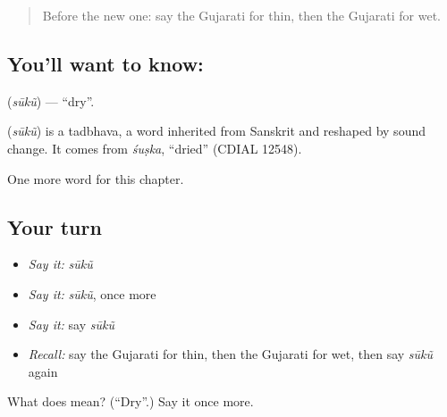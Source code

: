 \label{lesson:GU-C131-suku}



\begin{quote}
Before the new one: say the Gujarati for thin, then the Gujarati for wet.
\end{quote}

\subsection*{You'll want to know: }
\textbf{} (\emph{sūkũ}) — \textquotedblleft{}dry\textquotedblright{}.

\begin{cousinweb}
\textbf{} (\emph{sūkũ}) is a tadbhava, a word inherited from Sanskrit and reshaped by sound change. It comes from \emph{śuṣka}, \textquotedblleft{}dried\textquotedblright{} (CDIAL 12548).
\end{cousinweb}

\begin{grammarlens}[title={What you've built}]
One more word for this chapter.
\end{grammarlens}

\subsection*{Your turn}
\begin{itemize}
\raggedright
  \item \emph{Say it:} \emph{sūkũ}
  \item \emph{Say it:} \emph{sūkũ}, once more
  \item \emph{Say it:} say \emph{sūkũ}
  \item \emph{Recall:} say the Gujarati for thin, then the Gujarati for wet, then say \emph{sūkũ} again
\end{itemize}

\begin{tcolorbox}[breakable,colback=teal!4,colframe=teal!35!black,title={Before you move on}]
What does  mean? (\textquotedblleft{}Dry\textquotedblright{}.) Say it once more.
\end{tcolorbox}
